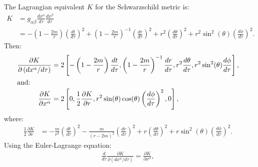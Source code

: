 \documentclass[a4paper]{article}
\begin{document}
\section{}
\subsection{}
The Lagrangian equivalent $K$ for the Schwarzschild metric is:
\begin{align*}
	K &= g_{\alpha \beta} \frac{dx^\alpha}{d\tau} \frac{dx^\beta}{d\tau}\\
	&=	-\left( 1- \frac{2m}{r}\right) \left( \frac{dt}{d\tau} \right)^2 + \left( 1- \frac{2m}{r}\right)^{-1} \left( \frac{dr}{d\tau} \right)^2    + r^2 \left( \frac{d\theta}{d\tau} \right)^2  + r^2 \sin^2(\theta) \left( \frac{d\phi}{d\tau} \right)^2  . 
\end{align*}
Then:
\begin{align*}
\frac{\partial K}{\partial \left(dx^\alpha / d\tau \right)} &= 2\left[-\left( 1- \frac{2m}{r}\right) \frac{dt}{d\tau} , \left( 1- \frac{2m}{r}\right)^{-1} \frac{dr}{d\tau} , r^2 \frac{d\theta}{d\tau} , r^2 \sin^2(\theta) \frac{d\phi}{d\tau} \right], \\
\intertext{and:}
\frac{\partial K}{\partial x^\alpha} &= 2\left[0, \frac{1}{2}\frac{\partial K}{\partial r}, r^2 \sin(\theta)\cos(\theta) \left( \frac{d\phi}{d\tau} \right)^2, 0 \right],
\end{align*}
where:
\begin{align*}
	\frac{1}{2}\frac{\partial K}{\partial r} &= -\frac{m}{r^2} \left(\frac{dt}{d\tau} \right)^2 - \frac{m}{(r-2m)^2}  \left(\frac{dr}{d\tau} \right)^2 + r  \left(\frac{d\theta}{d\tau} \right)^2  + r\sin^2(\theta)  \left(\frac{d\phi}{d\tau} \right)^2.
\end{align*}
Using the Euler-Lagrange equation:
\begin{align*}
\frac{d}{d\tau} \frac{\partial K}{\partial(dx^\alpha / d\tau)}  = \frac{\partial K}{\partial x^\alpha},
\end{align*}
\end{document}
